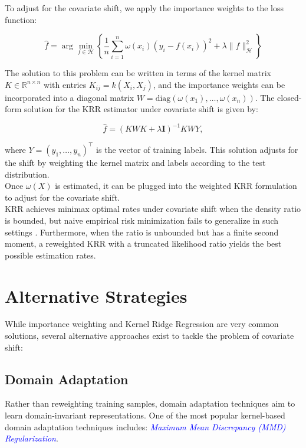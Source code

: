 To adjust for the covariate shift, we apply the importance weights to the loss function:

\begin{equation}
    \hat{f} = \arg\min_{f \in \mathcal{H}} \left\{ \frac{1}{n} \sum_{i=1}^{n} \omega(x_i)(y_i - f(x_i))^2 + \lambda \|f\|_{\mathcal{H}}^2 \right\}
\label{eqn:3.21}
\end{equation}

The solution to this problem can be written in terms of the kernel matrix $K \in \mathbb{R}^{n \times n}$ with entries $K_{ij} = k(X_i, X_j)$, and the importance weights can be incorporated into a diagonal matrix $W = \text{diag}(\omega(x_1), \dots, \omega(x_n))$. The closed-form solution for the KRR estimator under covariate shift is given by:

\begin{equation}
    \hat{f} = (KWK + \lambda \mathbf{I})^{-1}KWY,
\label{eqn:3.22}
\end{equation}

where $Y=(y_1, \dots, y_n)^\top$ is the vector of training labels. This solution adjusts for the shift by weighting the kernel matrix and labels according to the test distribution.\\

Once $\omega(X)$ is estimated, it can be plugged into the weighted KRR formulation to adjust for the covariate shift.\\

KRR achieves minimax optimal rates under covariate shift when the density ratio is bounded, but naive empirical risk minimization fails to generalize in such settings \citep{ma2022optimally}. Furthermore, when the ratio is unbounded but has a finite second moment, a reweighted KRR with a truncated likelihood ratio yields the best possible estimation rates.

\section{Alternative Strategies}

While importance weighting and Kernel Ridge Regression are very common solutions, several alternative approaches exist to tackle the problem of covariate shift:

\subsection{Domain Adaptation}

Rather than reweighting training samples, domain adaptation techniques aim to learn domain-invariant representations. One of the most popular kernel-based domain adaptation techniques includes: \textcolor{blue}{\emph{Maximum Mean Discrepancy (MMD) Regularization}}.\\

